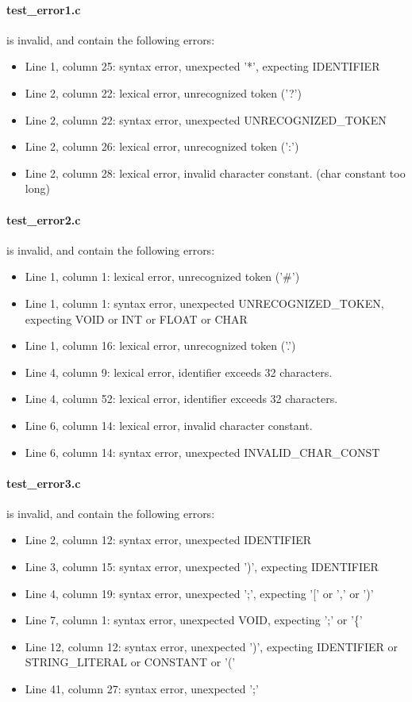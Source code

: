 \documentclass[12pt]{article}
\begin{document}
\paragraph{test{\_}error1.c} is invalid, and contain the following errors:
\begin{itemize}
\item Line 1, column 25: syntax error, unexpected '*', expecting IDENTIFIER
\item Line 2, column 22: lexical error, unrecognized token ('?')
\item Line 2, column 22: syntax error, unexpected UNRECOGNIZED\_TOKEN
\item Line 2, column 26: lexical error, unrecognized token (':')
\item Line 2, column 28: lexical error, invalid character constant. (char constant too long)
\end{itemize}

\paragraph{test{\_}error2.c} is invalid, and contain the following errors:
\begin{itemize}
\item Line 1, column 1: lexical error, unrecognized token ('\#')
\item Line 1, column 1: syntax error, unexpected UNRECOGNIZED\_TOKEN, expecting VOID or INT or FLOAT or CHAR
\item Line 1, column 16: lexical error, unrecognized token ('.')
\item Line 4, column 9: lexical error, identifier exceeds 32 characters.
\item Line 4, column 52: lexical error, identifier exceeds 32 characters.
\item Line 6, column 14: lexical error, invalid character constant.
\item Line 6, column 14: syntax error, unexpected INVALID\_CHAR\_CONST
\end{itemize}

\paragraph{test{\_}error3.c} is invalid, and contain the following errors:
\begin{itemize}
\item Line 2, column 12: syntax error, unexpected IDENTIFIER
\item Line 3, column 15: syntax error, unexpected ')', expecting IDENTIFIER
\item Line 4, column 19: syntax error, unexpected ';', expecting '[' or ',' or ')'
\item Line 7, column 1: syntax error, unexpected VOID, expecting ';' or '\{'
\item Line 12, column 12: syntax error, unexpected ')', expecting IDENTIFIER or STRING\_LITERAL or CONSTANT or '('
\item Line 41, column 27: syntax error, unexpected ';'
\end{itemize}
\end{document}
